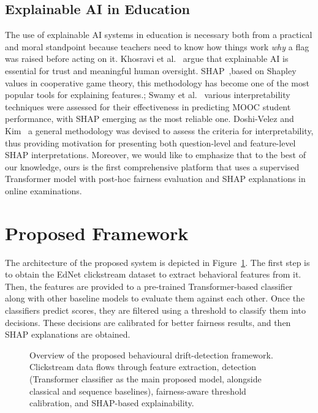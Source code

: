 \documentclass[sigconf]{acmart}
\begin{document}
\subsection{Explainable AI in Education}
The use of explainable AI systems in education is necessary both from a practical and moral standpoint because teachers need to know how things work \textit{why} a flag was raised before acting on it. Khosravi et al.~\cite{khosravi2022explainable} argue that explainable AI is essential for trust and meaningful human oversight. SHAP~\cite{lundberg2017unified},based on Shapley values in cooperative game theory, this methodology has become one of the most popular tools for explaining features.; Swamy et al.~\cite{swamy2022evaluating} various interpretability techniques were assessed for their effectiveness in predicting MOOC student performance, with SHAP emerging as the most reliable one.
Doshi-Velez and Kim~\cite{doshivelez2017towards} a general methodology was devised to assess the criteria for interpretability, thus providing motivation for presenting both question-level and feature-level SHAP interpretations. Moreover, we would like to emphasize that to the best of our knowledge, ours is the first comprehensive platform that uses a supervised Transformer model with post-hoc fairness evaluation and SHAP explanations in online examinations.

\section{Proposed Framework}
\label{sec:proposed}

The architecture of the proposed system is depicted in Figure~\ref{fig:system_overview}. The first step is to obtain the EdNet clickstream dataset to extract behavioral features from it. Then, the features are provided to a pre-trained Transformer-based classifier along with other baseline models to evaluate them against each other. Once the classifiers predict scores, they are filtered using a threshold to classify them into decisions. These decisions are calibrated for better fairness results, and then SHAP explanations are obtained.

\begin{figure}[htbp]
\centering
{}
\caption{Overview of the proposed behavioural drift-detection framework. Clickstream data flows through feature extraction, detection (Transformer classifier as the main proposed model, alongside classical and sequence baselines), fairness-aware threshold calibration, and SHAP-based explainability.}
\label{fig:system_overview}
\end{figure}
\end{document}
